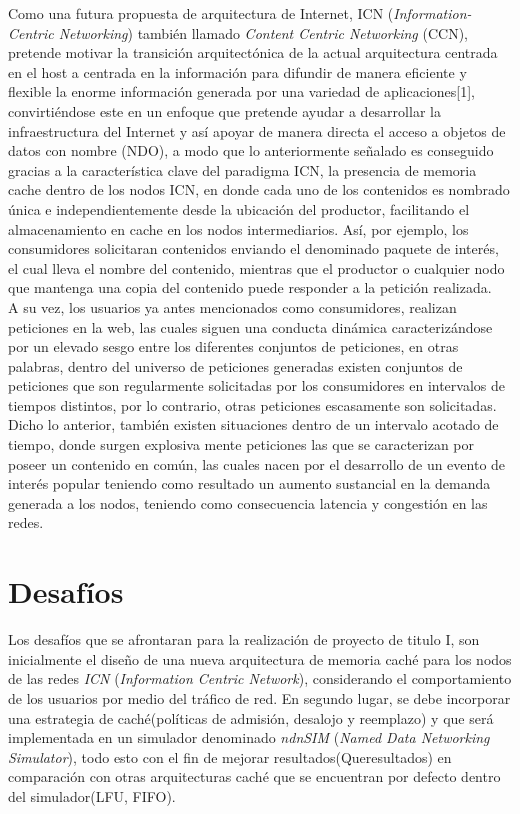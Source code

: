 \documentclass[12pt]{ociamthesis}  %
\begin{document}
Como una futura propuesta de arquitectura de Internet, ICN (\textit{Information-Centric Networking}) también llamado \textit{Content Centric Networking} (CCN), pretende motivar la transición arquitectónica de la actual arquitectura centrada en el host a centrada en la información para difundir de manera eficiente y flexible la enorme información generada por una variedad de aplicaciones[1], convirtiéndose este en un enfoque que pretende ayudar a desarrollar la infraestructura del Internet y así apoyar de manera directa el acceso a objetos de datos con nombre (NDO), a modo que lo anteriormente señalado es conseguido gracias a la característica clave del paradigma ICN, la presencia de memoria cache dentro de los nodos ICN, en donde cada uno de los contenidos es nombrado única e independientemente desde la ubicación del productor, facilitando el almacenamiento en cache en los nodos intermediarios. Así, por ejemplo, los consumidores solicitaran contenidos enviando el denominado paquete de interés, el cual lleva el nombre del contenido, mientras que el productor o cualquier nodo que mantenga una copia del contenido puede responder a la petición realizada.\\

A su vez, los usuarios ya antes mencionados como consumidores, realizan peticiones en la web, las cuales siguen una conducta dinámica caracterizándose por un elevado sesgo entre los diferentes conjuntos de peticiones, en otras palabras, dentro del universo de peticiones generadas existen conjuntos de peticiones que son regularmente solicitadas por los consumidores en intervalos de tiempos distintos, por lo contrario, otras peticiones escasamente son solicitadas. Dicho lo anterior, también existen situaciones dentro de un intervalo acotado de tiempo, donde surgen explosiva mente peticiones las que se caracterizan por poseer un contenido en común, las cuales nacen por el desarrollo de un evento de interés popular teniendo como resultado un aumento sustancial en la demanda generada a los nodos, teniendo como consecuencia latencia y congestión en las redes.


\section{Desafíos}
Los desafíos que se afrontaran para la realización de proyecto de titulo I, son inicialmente el diseño de una nueva arquitectura de memoria caché para los nodos de las redes \textit{ICN} (\textit{Information Centric Network}), considerando el comportamiento de los usuarios por medio del tráfico de red. En segundo lugar, se debe incorporar una estrategia de caché(políticas de admisión, desalojo y reemplazo) y que será implementada en un simulador denominado \textit{ndnSIM} (\textit{Named Data Networking Simulator}), todo esto con el fin de mejorar resultados(Queresultados) en comparación con otras arquitecturas caché que se encuentran por defecto dentro del simulador(LFU, FIFO).\\
\end{document}

